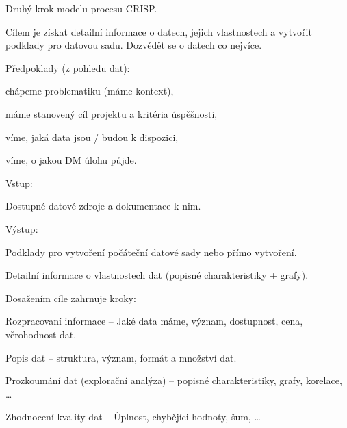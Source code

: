 \begin{compactitem}
    \item Druhý krok modelu procesu CRISP.

    \item Cílem je získat detailní informace o datech, jejich vlastnostech a vytvořit podklady pro datovou sadu. Dozvědět se o datech co nejvíce.

    \item Předpoklady (z pohledu dat): \begin{compactitem}
        \item chápeme problematiku (máme kontext),
        \item máme stanovený cíl projektu a kritéria úspěšnosti,
        \item víme, jaká data jsou / budou k dispozici,
        \item víme, o jakou DM úlohu půjde.
    \end{compactitem}

    \item Vstup: \begin{compactitem}
        \item Dostupné datové zdroje a dokumentace k nim.
    \end{compactitem}

    \item Výstup: \begin{compactitem}
        \item Podklady pro vytvoření počáteční datové sady nebo přímo vytvoření.
        \item Detailní informace o vlastnostech dat (popisné charakteristiky + grafy).
    \end{compactitem}

    \item Dosažením cíle zahrnuje kroky: \begin{compactitem}
        \item Rozpracovaní informace -- Jaké data máme, význam, dostupnost, cena, věrohodnost dat.

        \item Popis dat -- struktura, význam, formát a množství dat.

        \item Prozkoumání dat (explorační analýza) -- popisné charakteristiky, grafy, korelace, \dots

        \item Zhodnocení kvality dat -- Úplnost, chybějíci hodnoty, šum, \dots
    \end{compactitem}
\end{compactitem}

